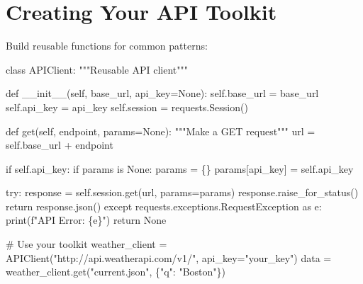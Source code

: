 \documentclass[
  letterpaper,
  DIV=11,
  numbers=noendperiod,
  oneside]{scrreprt}
\newenvironment{Shaded}{}{}
\newcommand{\BuiltInTok}[1]{\textcolor[rgb]{0.84,0.23,0.29}{#1}}
\newcommand{\CommentTok}[1]{\textcolor[rgb]{0.42,0.45,0.49}{#1}}
\newcommand{\ControlFlowTok}[1]{\textcolor[rgb]{0.84,0.23,0.29}{#1}}
\newcommand{\FunctionTok}[1]{\textcolor[rgb]{0.44,0.26,0.76}{#1}}
\newcommand{\ImportTok}[1]{\textcolor[rgb]{0.01,0.18,0.38}{#1}}
\newcommand{\KeywordTok}[1]{\textcolor[rgb]{0.84,0.23,0.29}{#1}}
\newcommand{\NormalTok}[1]{\textcolor[rgb]{0.14,0.16,0.18}{#1}}
\newcommand{\OperatorTok}[1]{\textcolor[rgb]{0.14,0.16,0.18}{#1}}
\newcommand{\SpecialCharTok}[1]{\textcolor[rgb]{0.00,0.36,0.77}{#1}}
\newcommand{\SpecialStringTok}[1]{\textcolor[rgb]{0.01,0.18,0.38}{#1}}
\newcommand{\StringTok}[1]{\textcolor[rgb]{0.01,0.18,0.38}{#1}}
\newcommand{\VariableTok}[1]{\textcolor[rgb]{0.89,0.38,0.04}{#1}}
\begin{document}
\section{Creating Your API Toolkit}\label{creating-your-api-toolkit}

Build reusable functions for common patterns:

\begin{Shaded}
\begin{Highlighting}[]
\KeywordTok{class}\NormalTok{ APIClient:}
    \CommentTok{"""Reusable API client"""}
    
    \KeywordTok{def} \FunctionTok{\_\_init\_\_}\NormalTok{(}\VariableTok{self}\NormalTok{, base\_url, api\_key}\OperatorTok{=}\VariableTok{None}\NormalTok{):}
        \VariableTok{self}\NormalTok{.base\_url }\OperatorTok{=}\NormalTok{ base\_url}
        \VariableTok{self}\NormalTok{.api\_key }\OperatorTok{=}\NormalTok{ api\_key}
        \VariableTok{self}\NormalTok{.session }\OperatorTok{=}\NormalTok{ requests.Session()}
    
    \KeywordTok{def}\NormalTok{ get(}\VariableTok{self}\NormalTok{, endpoint, params}\OperatorTok{=}\VariableTok{None}\NormalTok{):}
        \CommentTok{"""Make a GET request"""}
\NormalTok{        url }\OperatorTok{=} \VariableTok{self}\NormalTok{.base\_url }\OperatorTok{+}\NormalTok{ endpoint}
        
        \ControlFlowTok{if} \VariableTok{self}\NormalTok{.api\_key:}
            \ControlFlowTok{if}\NormalTok{ params }\KeywordTok{is} \VariableTok{None}\NormalTok{:}
\NormalTok{                params }\OperatorTok{=}\NormalTok{ \{\}}
\NormalTok{            params[}\StringTok{\textquotesingle{}api\_key\textquotesingle{}}\NormalTok{] }\OperatorTok{=} \VariableTok{self}\NormalTok{.api\_key}
        
        \ControlFlowTok{try}\NormalTok{:}
\NormalTok{            response }\OperatorTok{=} \VariableTok{self}\NormalTok{.session.get(url, params}\OperatorTok{=}\NormalTok{params)}
\NormalTok{            response.raise\_for\_status()}
            \ControlFlowTok{return}\NormalTok{ response.json()}
        \ControlFlowTok{except}\NormalTok{ requests.exceptions.RequestException }\ImportTok{as}\NormalTok{ e:}
            \BuiltInTok{print}\NormalTok{(}\SpecialStringTok{f"API Error: }\SpecialCharTok{\{}\NormalTok{e}\SpecialCharTok{\}}\SpecialStringTok{"}\NormalTok{)}
            \ControlFlowTok{return} \VariableTok{None}

\CommentTok{\# Use your toolkit}
\NormalTok{weather\_client }\OperatorTok{=}\NormalTok{ APIClient(}\StringTok{"http://api.weatherapi.com/v1/"}\NormalTok{, api\_key}\OperatorTok{=}\StringTok{"your\_key"}\NormalTok{)}
\NormalTok{data }\OperatorTok{=}\NormalTok{ weather\_client.get(}\StringTok{"current.json"}\NormalTok{, \{}\StringTok{"q"}\NormalTok{: }\StringTok{"Boston"}\NormalTok{\})}
\end{Highlighting}
\end{Shaded}
\end{document}
